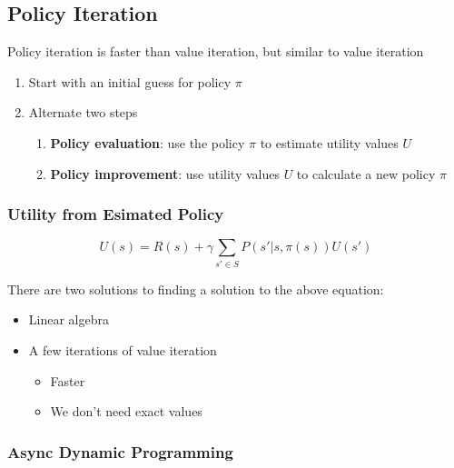   \subsection{Policy Iteration}

    Policy iteration is faster than value iteration, but similar to value
    iteration

    \begin{enumerate}
      \item Start with an initial guess for policy $ \pi $
      \item Alternate two steps
      \begin{enumerate}
        \item \textbf{Policy evaluation}: use the policy $ \pi $ to estimate
        utility values $ U $
        \item \textbf{Policy improvement}: use utility values $ U $ to
        calculate a new policy $ \pi $
      \end{enumerate}
    \end{enumerate}

    \subsubsection{Utility from Esimated Policy}

      \begin{equation}
        U\left( s \right)
          = R\left( s \right)
          + \gamma \sum_{s' \in S}
          P\left( s' | s, \pi\left( s \right) \right)
          U\left( s' \right)
      \end{equation}

      There are two solutions to finding a solution to the above equation:

      \begin{itemize}
        \item Linear algebra
        \item A few iterations of value iteration
        \begin{itemize}
          \item Faster
          \item We don't need exact values
        \end{itemize}
      \end{itemize}

    \subsubsection{Async Dynamic Programming}

